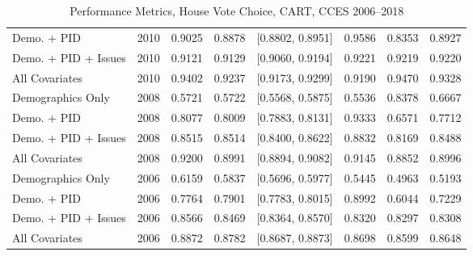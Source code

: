 \begin{table}[ht]
\begin{tabular}{lrrrlrrr}
  Demo. + PID & 2010 & 0.9025 & 0.8878 & [0.8802, 0.8951] & 0.9586 & 0.8353 & 0.8927 \\ 
  Demo. + PID + Issues & 2010 & 0.9121 & 0.9129 & [0.9060, 0.9194] & 0.9221 & 0.9219 & 0.9220 \\ 
  All Covariates & 2010 & 0.9402 & 0.9237 & [0.9173, 0.9299] & 0.9190 & 0.9470 & 0.9328 \\ 
  Demographics Only & 2008 & 0.5721 & 0.5722 & [0.5568, 0.5875] & 0.5536 & 0.8378 & 0.6667 \\ 
  Demo. + PID & 2008 & 0.8077 & 0.8009 & [0.7883, 0.8131] & 0.9333 & 0.6571 & 0.7712 \\ 
  Demo. + PID + Issues & 2008 & 0.8515 & 0.8514 & [0.8400, 0.8622] & 0.8832 & 0.8169 & 0.8488 \\ 
  All Covariates & 2008 & 0.9200 & 0.8991 & [0.8894, 0.9082] & 0.9145 & 0.8852 & 0.8996 \\ 
  Demographics Only & 2006 & 0.6159 & 0.5837 & [0.5696, 0.5977] & 0.5445 & 0.4963 & 0.5193 \\ 
  Demo. + PID & 2006 & 0.7764 & 0.7901 & [0.7783, 0.8015] & 0.8992 & 0.6044 & 0.7229 \\ 
  Demo. + PID + Issues & 2006 & 0.8566 & 0.8469 & [0.8364, 0.8570] & 0.8320 & 0.8297 & 0.8308 \\ 
  All Covariates & 2006 & 0.8872 & 0.8782 & [0.8687, 0.8873] & 0.8698 & 0.8599 & 0.8648 \\ 
   \bottomrule
\end{tabular}
\caption{Performance Metrics, House Vote Choice, CART, CCES 2006--2018} 
\label{tab:cces_house_cart}
\end{table}
